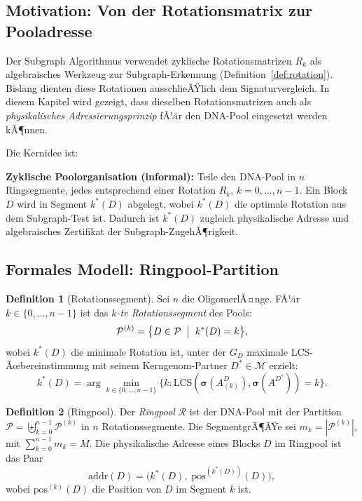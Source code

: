 ﻿\documentclass[a4paper,12pt]{article}
\theoremstyle{definition}
\newtheorem{definition}{Definition}[section]
\theoremstyle{plain}
\begin{document}
\subsection{Motivation: Von der Rotationsmatrix zur Pooladresse}
\label{ssec:ringpool_motivation}

Der Subgraph Algorithmus verwendet zyklische Rotationsmatrizen $R_k$
als algebraisches Werkzeug zur Subgraph-Erkennung
(Definition~\ref{def:rotation}).  Bislang dienten diese Rotationen
ausschlieÃŸlich dem Signaturvergleich.  In diesem Kapitel wird gezeigt,
dass dieselben Rotationsmatrizen auch als \emph{physikalisches
Adressierungsprinzip} fÃ¼r den DNA-Pool eingesetzt werden kÃ¶nnen.

Die Kernidee ist:

\begin{mdframed}[nobreak=true]
  \textbf{Zyklische Poolorganisation (informal):} Teile den DNA-Pool
  in $n$ Ringsegmente, jedes entsprechend einer Rotation $R_k$, $k = 0,\ldots,n-1$.
  Ein Block $D$ wird in Segment $k^*(D)$ abgelegt, wobei $k^*(D)$ die
  optimale Rotation aus dem Subgraph-Test ist.  Dadurch ist $k^*(D)$
  zugleich physikalische Adresse und algebraisches Zertifikat der
  Subgraph-ZugehÃ¶rigkeit.
\end{mdframed}

\subsection{Formales Modell: Ringpool-Partition}
\label{ssec:ringpool_modell}

\begin{definition}[Rotationssegment]
\label{def:rotationssegment}
  Sei $n$ die OligomerlÃ¤nge.  FÃ¼r $k \in \{0, \ldots, n-1\}$ ist das
  \emph{$k$-te Rotationssegment} des Pools:
  \[
    \mathcal{P}^{(k)} = \bigl\{D \in \mathcal{P} \;\bigm|\;
      k^*(D) = k \bigr\},
  \]
  wobei $k^*(D)$ die minimale Rotation ist, unter der $G_D$ maximale
  LCS-Ãœbereinstimmung mit seinem Kerngenom-Partner $D^* \in \mathcal{M}$
  erzielt:
  \[
    k^*(D) = \arg\min_{k \in \{0,\ldots,n-1\}}
    \bigl\{k : \mathrm{LCS}\!\left(\boldsymbol{\sigma}(A^D_{(k)}),
    \boldsymbol{\sigma}(A^{D^*})\right) = k\bigr\}.
  \]
\end{definition}

\begin{definition}[Ringpool]
\label{def:ringpool}
  Der \emph{Ringpool} $\mathcal{R}$ ist der DNA-Pool mit der Partition
  $\mathcal{P} = \biguplus_{k=0}^{n-1} \mathcal{P}^{(k)}$ in
  $n$ Rotationssegmente.  Die SegmentgrÃ¶ÃŸe sei
  $m_k = |\mathcal{P}^{(k)}|$, mit $\sum_{k=0}^{n-1} m_k = M$.
  Die physikalische Adresse eines Blocks $D$ im Ringpool ist das Paar
  \[
    \mathrm{addr}(D) = \bigl(k^*(D),\; \mathrm{pos}^{(k^*(D))}(D)\bigr),
  \]
  wobei $\mathrm{pos}^{(k)}(D)$ die Position von $D$ im Segment $k$ ist.
\end{definition}
\end{document}
